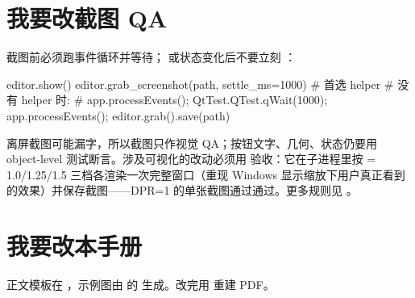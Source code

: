 \documentclass[11pt,oneside,openany]{book}
\begin{document}
\section{我要改截图 QA}
截图前必须跑事件循环并等待； 或状态变化后不要立刻 ：

\begin{codeblock}[Python]
editor.show()
editor.grab_screenshot(path, settle_ms=1000)        # 首选 helper
# 没有 helper 时:
# app.processEvents(); QtTest.QTest.qWait(1000); app.processEvents(); editor.grab().save(path)
\end{codeblock}

离屏截图可能漏字，所以截图只作视觉 QA；按钮文字、几何、状态仍要用 object-level 测试断言。涉及可视化的改动必须用  验收：它在子进程里按  = 1.0/1.25/1.5 三档各渲染一次完整窗口（重现 Windows 显示缩放下用户真正看到的效果）并保存截图——DPR=1 的单张截图通过通过。更多规则见 。

\section{我要改本手册}
正文模板在 ，示例图由  的  生成。改完用  重建 PDF。
\end{document}
